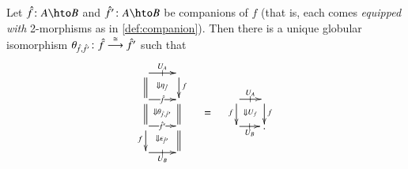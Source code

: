 \begin{lem}\label{thm:theta}
  Let $\fhat\maps A\hto B$ and $\fhat'\maps A\hto B$ be companions of
  $f$ (that is, each comes \emph{equipped with} 2-morphisms as in
  \autoref{def:companion}).  Then there is a unique globular isomorphism
  $\theta_{\fhat,\fhat'}\maps \fhat\too[\iso]\fhat'$ such that
  \begin{equation}\label{eq:comp-iso}
    \vcenter{\xymatrix@R=1.5pc{
        \ar[r]|-@{|}^-{U_A} \ar@{=}[d] \ar@{}[dr]|{\Downarrow \eta_{\hat{f}}} &  \ar[d]^f\\
        \ar[r]|-{\fhat} \ar@{=}[d] \ar@{}[dr]|{\Downarrow \theta_{\fhat,\fhat'}} &  \ar@{=}[d]\\
        \ar[r]|-{\fhat'} \ar[d]_f \ar@{}[dr]|{\Downarrow \epsilon_{\hat{f}'}} & \ar@{=}[d]\\
        \ar[r]|-@{|}_-{U_B} & }} \quad = \quad
    \vcenter{\xymatrix@-.5pc{ \ar[r]|-@{|}^-{U_A} \ar[d]_f
        \ar@{}[dr]|{\Downarrow U_f} &  \ar[d]^f\\
        \ar[r]|-@{|}_-{U_B} & .}}
  \end{equation}
\end{lem}
